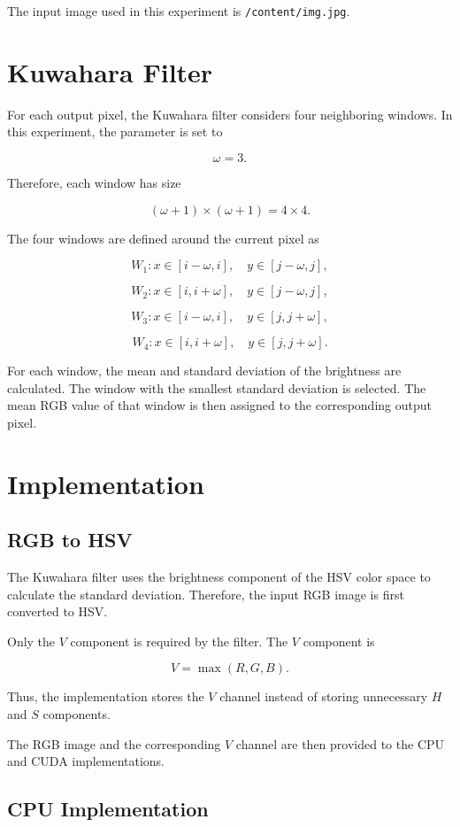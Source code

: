 \documentclass[11pt]{article}
\begin{document}
The input image used in this experiment is \texttt{/content/img.jpg}.

\section{Kuwahara Filter}

For each output pixel, the Kuwahara filter considers four neighboring
windows. In this experiment, the parameter is set to

\[
\omega = 3.
\]

Therefore, each window has size

\[
(\omega+1)\times(\omega+1)
=
4\times4.
\]

The four windows are defined around the current pixel as

\[
W_1: x\in[i-\omega,i],\quad y\in[j-\omega,j],
\]

\[
W_2: x\in[i,i+\omega],\quad y\in[j-\omega,j],
\]

\[
W_3: x\in[i-\omega,i],\quad y\in[j,j+\omega],
\]

\[
W_4: x\in[i,i+\omega],\quad y\in[j,j+\omega].
\]

For each window, the mean and standard deviation of the brightness
are calculated. The window with the smallest standard deviation is
selected. The mean RGB value of that window is then assigned to the
corresponding output pixel.

\section{Implementation}

\subsection{RGB to HSV}

The Kuwahara filter uses the brightness component of the HSV color
space to calculate the standard deviation. Therefore, the input RGB
image is first converted to HSV.

Only the $V$ component is required by the filter. The $V$ component is

\[
V = \max(R,G,B).
\]

Thus, the implementation stores the $V$ channel instead of storing
unnecessary $H$ and $S$ components.

The RGB image and the corresponding $V$ channel are then provided to
the CPU and CUDA implementations.

\subsection{CPU Implementation}
\end{document}
